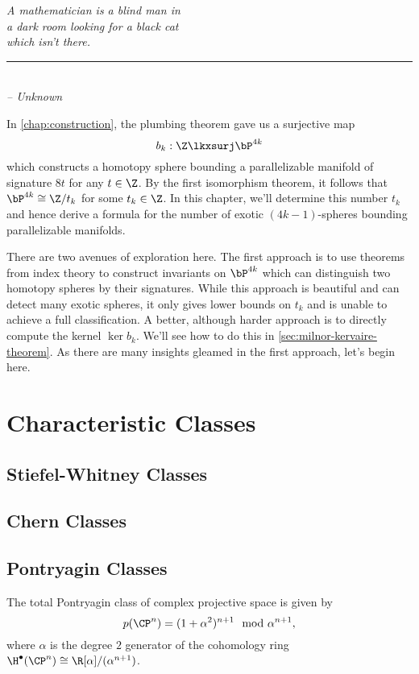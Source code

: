 \begin{flushleft}
	\textsl{A mathematician is a blind man in }\\
	\textsl{a dark room looking for a black cat}\\
	\textsl{which isn’t there.}\\
	\rule[0pt]{15em}{0.5pt}\\
	\textsl{-- Unknown}
	\vspace{2em}
\end{flushleft}

In \cref{chap:construction}, the plumbing theorem gave us a surjective map
\[
		b_k : \Z \lkxsurj \bP^{4k}
\]
which constructs a homotopy sphere bounding a parallelizable manifold of signature $8t$ for any $t\in \Z$. By the first isomorphism theorem, it follows that $\bP^{4k}\cong \Z/t_k$ for some $t_k\in \Z$. In this chapter, we'll determine this number $t_k$ and hence derive a formula for the number of exotic $(4k-1)$-spheres bounding parallelizable manifolds. 

There are two avenues of exploration here. The first approach is to use theorems from index theory to construct invariants on $\bP^{4k}$ which can distinguish two homotopy spheres by their signatures. While this approach is beautiful and can detect many exotic spheres, it only gives lower bounds on $t_k$ and is unable to achieve a full classification. A better, although harder approach is to directly compute the kernel $\ker b_k$. We'll see how to do this in \cref{sec:milnor-kervaire-theorem}. As there are many insights gleamed in the first approach, let's begin here.

\section{Characteristic Classes}

\subsection{Stiefel-Whitney Classes}
\subsection{Chern Classes}
\subsection{Pontryagin Classes}

\begin{proposition}\label{prop:pontryagin-class-of-complex-projective-space}
	The total Pontryagin class of complex projective space is given by
	\[
		p(\CP^n) = (1+\alpha^2)^{n+1}\mod \alpha^{n+1},
	\]
	where $\alpha$ is the degree $2$ generator of the cohomology ring $\H^\bullet(\CP^n)\cong \R[\alpha]/(\alpha^{n+1})$.
\end{proposition}

